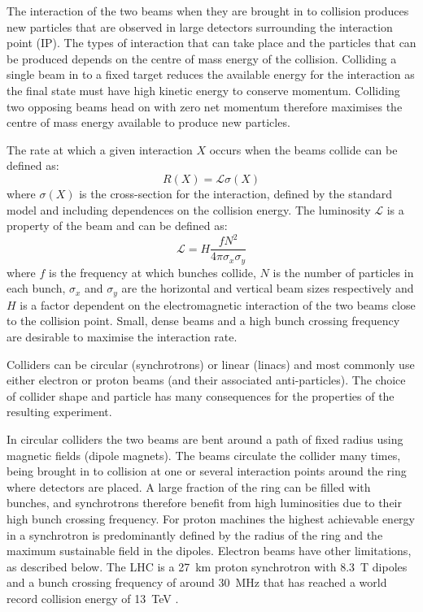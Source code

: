 The interaction of the two beams when they are brought in to collision produces new particles that are observed in large detectors surrounding the interaction point (IP). The types of interaction that can take place and the particles that can be produced depends on the centre of mass energy of the collision. Colliding a single beam in to a fixed target reduces the available energy for the interaction as the final state must have high kinetic energy to conserve momentum. Colliding two opposing beams head on with zero net momentum therefore maximises the centre of mass energy available to produce new particles.

The rate at which a given interaction \(X\) occurs when the beams collide can be defined as:
\begin{equation}
R(X) = \mathscr{L} \sigma(X)
\end{equation}
where \(\sigma(X)\) is the cross-section for the interaction, defined by the standard model and including dependences on the collision energy. The luminosity \(\mathscr{L}\) is a property of the beam and can be defined as:
\begin{equation}
\mathscr{L} = H\frac{fN^2}{4\pi\sigma_x\sigma_y}
\end{equation}
where \(f\) is the frequency at which bunches collide, \(N\) is the number of particles in each bunch, \(\sigma_x\) and \(\sigma_y\) are the horizontal and vertical beam sizes respectively and \(H\) is a factor dependent on the electromagnetic interaction of the two beams close to the collision point. Small, dense beams and a high bunch crossing frequency are desirable to maximise the interaction rate.


Colliders can be circular (synchrotrons) or linear (linacs) and most commonly use either electron or proton beams (and their associated anti-particles). %
The choice of collider shape and particle has many consequences for the properties of the resulting experiment. 

In circular colliders the two beams are bent around a path of fixed radius using magnetic fields (dipole magnets). The beams circulate the collider many times, being brought in to collision at one or several interaction points around the ring where detectors are placed. A large fraction of the ring can be filled with bunches, 
and %
synchrotrons therefore benefit from high luminosities due to their high bunch crossing frequency. 
For proton machines the highest achievable energy in a synchrotron is predominantly defined by the radius of the ring and the maximum sustainable field in the dipoles. Electron beams have other limitations, as described below. The LHC is a 27~km proton synchrotron with 8.3~T dipoles and a bunch crossing frequency of around 30~MHz that has reached a world record collision energy of 13~TeV \cite{LHC}.

